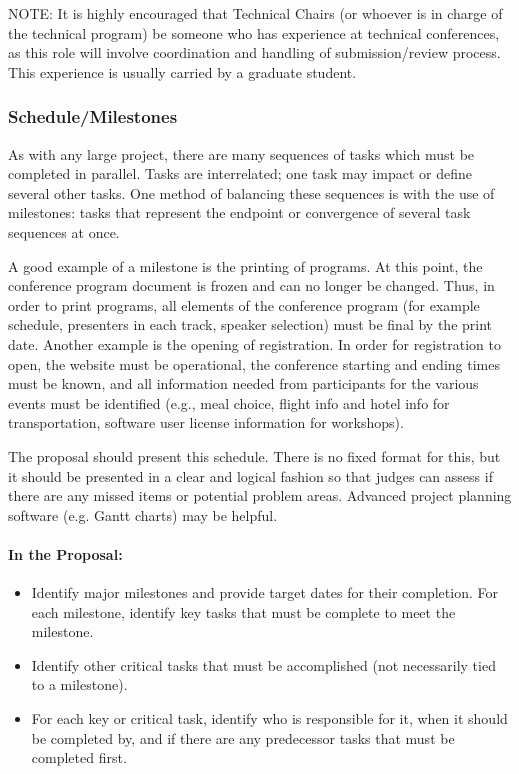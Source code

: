 \documentclass[12pt]{article}
\begin{document}
NOTE: It is highly encouraged that Technical Chairs (or whoever is in charge of the technical program) be someone who has experience at technical conferences, as this role will involve coordination and handling of submission/review process. This experience is usually carried by a graduate student.

\subsubsection{Schedule/Milestones}
As with any large project, there are many sequences of tasks which must be completed in parallel. Tasks are interrelated; one task may impact or define several other tasks. One method of balancing these sequences is with the use of milestones: tasks that represent the endpoint or convergence of several task sequences at once.

A good example of a milestone is the printing of programs. At this point, the conference program document is frozen and can no longer be changed. Thus, in order to print programs, all elements of the conference program (for example schedule, presenters in each track, speaker selection) must be final by the print date. Another example is the opening of registration. In order for registration to open, the website must be operational, the conference starting and ending times must be known, and all information needed from participants for the various events must be identified (e.g., meal choice, flight info and hotel info for transportation, software user license information for workshops).

The proposal should present this schedule. There is no fixed format for this, but it should be presented in a clear and logical fashion so that judges can assess if there are any missed items or potential problem areas. Advanced project planning software (e.g. Gantt charts) may be helpful.

\paragraph{In the Proposal:}
\begin{itemize}
\item{Identify major milestones and provide target dates for their completion. For each milestone, identify key tasks that must be complete to meet the milestone.}
\item{Identify other critical tasks that must be accomplished (not necessarily tied to a milestone).}
\item{For each key or critical task, identify who is responsible for it, when it should be completed by, and if there are any predecessor tasks that must be completed first.}
\end{itemize}
\end{document}
